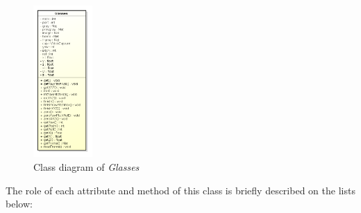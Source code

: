 \documentclass[msc, a4paper, classic, en]{ufbathesis}
\begin{document}
\begin{figure}
\centering
\includegraphics[width=0.2\textwidth]{images/glasses.png}
\caption{Class diagram of \textit{Glasses}}
\label{fig:glassesclassdiagram}
\end{figure}

The role of each attribute and method of this class is briefly described on the lists below:
\end{document}
